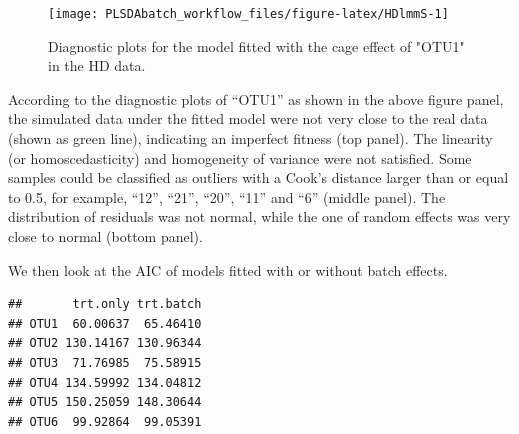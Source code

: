 \documentclass[
]{book}
\newenvironment{Shaded}{\begin{snugshade}}{\end{snugshade}}
\newcommand{\AttributeTok}[1]{\textcolor[rgb]{0.77,0.63,0.00}{#1}}
\newcommand{\ControlFlowTok}[1]{\textcolor[rgb]{0.13,0.29,0.53}{\textbf{#1}}}
\newcommand{\DecValTok}[1]{\textcolor[rgb]{0.00,0.00,0.81}{#1}}
\newcommand{\FunctionTok}[1]{\textcolor[rgb]{0.00,0.00,0.00}{#1}}
\newcommand{\NormalTok}[1]{#1}
\newcommand{\OtherTok}[1]{\textcolor[rgb]{0.56,0.35,0.01}{#1}}
\newcommand{\SpecialCharTok}[1]{\textcolor[rgb]{0.00,0.00,0.00}{#1}}
\newcommand{\StringTok}[1]{\textcolor[rgb]{0.31,0.60,0.02}{#1}}
\begin{document}
\begin{Shaded}
\end{Shaded}

\begin{figure}

{\centering \texttt{[image: PLSDAbatch\_workflow\_files/figure-latex/HDlmmS-1]} 

}

\caption{Diagnostic plots for the model fitted with the cage effect of "OTU1" in the HD data.}\label{fig:HDlmmS}
\end{figure}

According to the diagnostic plots of ``OTU1'' as shown in the above figure panel, the simulated data under the fitted model were not very close to the real data (shown as green line), indicating an imperfect fitness (top panel). The linearity (or homoscedasticity) and homogeneity of variance were not satisfied. Some samples could be classified as outliers with a Cook's distance larger than or equal to 0.5, for example, ``12'', ``21'', ``20'', ``11'' and ``6'' (middle panel). The distribution of residuals was not normal, while the one of random effects was very close to normal (bottom panel).

We then look at the AIC of models fitted with or without batch effects.

\begin{Shaded}
\end{Shaded}

\begin{verbatim}
##       trt.only trt.batch
## OTU1  60.00637  65.46410
## OTU2 130.14167 130.96344
## OTU3  71.76985  75.58915
## OTU4 134.59992 134.04812
## OTU5 150.25059 148.30644
## OTU6  99.92864  99.05391
\end{verbatim}
\end{document}
